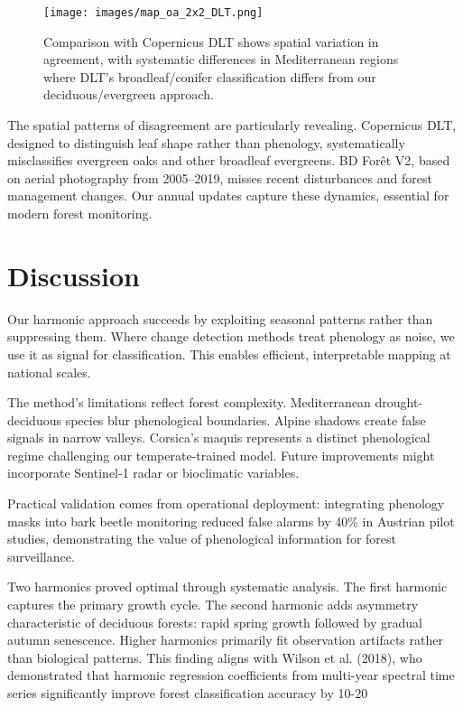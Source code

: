 \documentclass[utf8]{FrontiersinHarvard}
\begin{document}
\begin{figure}[H]
    \centering
    \texttt{[image: images/map\_oa\_2x2\_DLT.png]}
    \caption{Comparison with Copernicus DLT shows spatial variation in agreement, with systematic differences in Mediterranean regions where DLT's broadleaf/conifer classification differs from our deciduous/evergreen approach.}
    \label{fig:agreement_dlt}
\end{figure}

The spatial patterns of disagreement are particularly revealing. Copernicus DLT, designed to distinguish leaf shape rather than phenology, systematically misclassifies evergreen oaks and other broadleaf evergreens. BD Forêt V2, based on aerial photography from 2005–2019, misses recent disturbances and forest management changes. Our annual updates capture these dynamics, essential for modern forest monitoring.

\section{Discussion}

Our harmonic approach succeeds by exploiting seasonal patterns rather than suppressing them. Where change detection methods treat phenology as noise, we use it as signal for classification. This enables efficient, interpretable mapping at national scales.

The method's limitations reflect forest complexity. Mediterranean drought-deciduous species blur phenological boundaries. Alpine shadows create false signals in narrow valleys. Corsica's maquis represents a distinct phenological regime challenging our temperate-trained model. Future improvements might incorporate Sentinel-1 radar or bioclimatic variables.

Practical validation comes from operational deployment: integrating phenology masks into bark beetle monitoring reduced false alarms by 40\% in Austrian pilot studies, demonstrating the value of phenological information for forest surveillance.

Two harmonics proved optimal through systematic analysis. The first harmonic captures the primary growth cycle. The second harmonic adds asymmetry characteristic of deciduous forests: rapid spring growth followed by gradual autumn senescence. Higher harmonics primarily fit observation artifacts rather than biological patterns. This finding aligns with Wilson et al. (2018), who demonstrated that harmonic regression coefficients from multi-year spectral time series significantly improve forest classification accuracy by 10-20%
\end{document}
